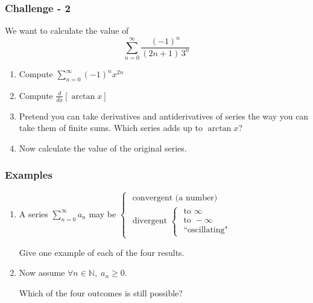 \documentclass[14pt]{beamer}
\begin{document}
\begin{frame}[t]
	\fontsize{13}{13}\selectfont
	\frametitle{Challenge - 2}

	We want to calculate the value of
	\[
		\sum_{n=0}^{\infty}\frac{(-1)^{n}}{(2n+1) \, 3^{n}}
	\]

	\hrulefill

	\begin{enumerate}
		\item Compute $\displaystyle \sum_{n=0}^{\infty}(-1)^{n}x^{2n}$

		\item Compute $\displaystyle \frac{d}{dx}\left[ \arctan x \right]$
			\vspace{.2cm}

		\item Pretend you can take derivatives and antiderivatives of series the way
			you can take them of finite sums. Which series adds up to
			$\displaystyle \arctan x$?
			\vspace{.2cm}

		\item Now calculate the value of the original series.
	\end{enumerate}
\end{frame}

\begin{frame}[t]
	\frametitle{Examples}

	\begin{enumerate}
		\item A series $\displaystyle \sum_{n=0}^{\infty}a_{n}$ may be $\displaystyle
			\begin{cases}
				\text{ convergent (a number) }                                                                                  \\
				\text{ divergent } \begin{cases}\text{ to } \infty \\ \text{ to } - \infty \\ \text{ ``oscillating"}\end{cases}
			\end{cases}$
			\vspace{.5cm}

			Give one example of each of the four results.
			\vspace{.5cm}

		\item Now assume $\displaystyle \forall n \in \mathbb{N}, \; a_{n}\geq 0$.

			Which of the four outcomes is still possible?
	\end{enumerate}
\end{frame}
\end{document}
